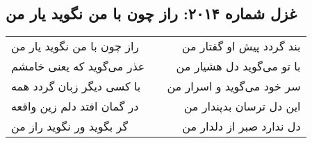 \begin{center}
\section*{غزل شماره ۲۰۱۴: راز چون با من نگوید یار من}
\label{sec:2014}
\begin{longtable}{l p{0.5cm} r}
راز چون با من نگوید یار من
&&
بند گردد پیش او گفتار من
\\
عذر می‌گوید که یعنی خامشم
&&
با تو می‌گوید دل هشیار من
\\
با کسی دیگر زبان گردد همه
&&
سر خود می‌گوید و اسرار من
\\
در گمان افتد دلم زین واقعه
&&
این دل ترسان بدپندار من
\\
گر بگوید ور نگوید راز من
&&
دل ندارد صبر از دلدار من
\\
\end{longtable}
\end{center}
